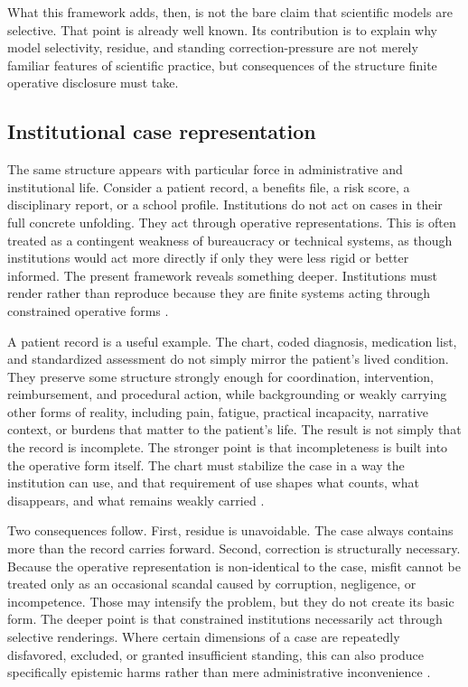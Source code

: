 \documentclass[11pt]{article}
\begin{document}
What this framework adds, then, is not the bare claim that scientific models are selective. That point is already well known. Its contribution is to explain why model selectivity, residue, and standing correction-pressure are not merely familiar features of scientific practice, but consequences of the structure finite operative disclosure must take.

\subsection{Institutional case representation}

The same structure appears with particular force in administrative and institutional life. Consider a patient record, a benefits file, a risk score, a disciplinary report, or a school profile. Institutions do not act on cases in their full concrete unfolding. They act through operative representations. This is often treated as a contingent weakness of bureaucracy or technical systems, as though institutions would act more directly if only they were less rigid or better informed. The present framework reveals something deeper. Institutions must render rather than reproduce because they are finite systems acting through constrained operative forms \cite{BowkerStar1999SortingThingsOut}.

A patient record is a useful example. The chart, coded diagnosis, medication list, and standardized assessment do not simply mirror the patient's lived condition. They preserve some structure strongly enough for coordination, intervention, reimbursement, and procedural action, while backgrounding or weakly carrying other forms of reality, including pain, fatigue, practical incapacity, narrative context, or burdens that matter to the patient's life. The result is not simply that the record is incomplete. The stronger point is that incompleteness is built into the operative form itself. The chart must stabilize the case in a way the institution can use, and that requirement of use shapes what counts, what disappears, and what remains weakly carried \cite{BowkerStar1999SortingThingsOut,Douglas2004IrreducibleComplexityObjectivity}.

Two consequences follow. First, residue is unavoidable. The case always contains more than the record carries forward. Second, correction is structurally necessary. Because the operative representation is non-identical to the case, misfit cannot be treated only as an occasional scandal caused by corruption, negligence, or incompetence. Those may intensify the problem, but they do not create its basic form. The deeper point is that constrained institutions necessarily act through selective renderings. Where certain dimensions of a case are repeatedly disfavored, excluded, or granted insufficient standing, this can also produce specifically epistemic harms rather than mere administrative inconvenience \cite{Fricker2007EpistemicInjustice,Haraway1988SituatedKnowledges}.
\end{document}
